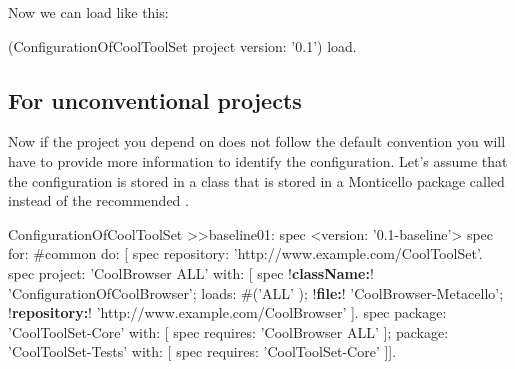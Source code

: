 \documentclass[a4paper,10pt,twoside]{book}
\begin{document}
Now we can load  like this:

\begin{code}{}
(ConfigurationOfCoolToolSet project version: '0.1') load.
\end{code}

\subsection{For unconventional projects}

Now if the project you depend on does not follow the default convention you will have to provide more information to identify
the configuration. Let's assume that the configuration is stored in a class  that is stored in a Monticello package called  instead of the recommended .


\begin{code}{}
ConfigurationOfCoolToolSet >>baseline01: spec
       <version: '0.1-baseline'>
       spec for: #common do: [
              spec repository: 'http://www.example.com/CoolToolSet'.
              spec project: 'CoolBrowser ALL' with: [
                            spec
                                   !\textbf{className:}! 'ConfigurationOfCoolBrowser';
                                   loads: #('ALL' );
                                   !\textbf{file:}! 'CoolBrowser-Metacello';
                                   !\textbf{repository:}! 'http://www.example.com/CoolBrowser' ].
              spec
                     package: 'CoolToolSet-Core' with: [ spec requires: 'CoolBrowser ALL' ];
                     package: 'CoolToolSet-Tests' with: [ spec requires: 'CoolToolSet-Core' ]].
\end{code}
\end{document}
